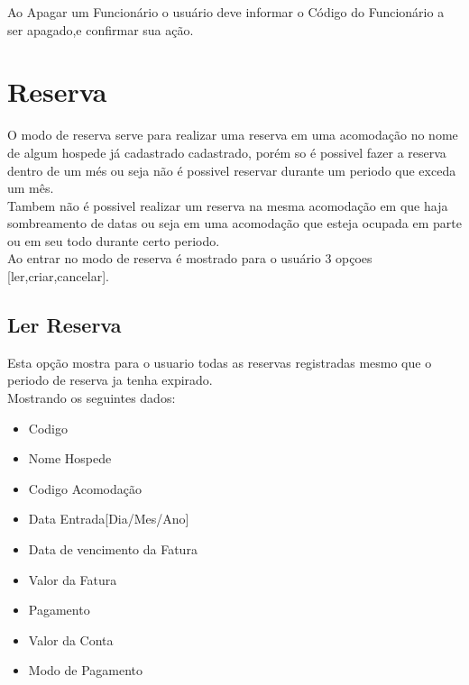 \documentclass[titlepage]{article}
\begin{document}
				Ao Apagar um Funcionário o usuário deve informar o Código do Funcionário a ser apagado,e confirmar sua ação. \\

				\newpage
				\section{Reserva}
				O modo de reserva serve para realizar uma reserva em uma acomodação no nome de algum hospede já cadastrado cadastrado, porém so é possivel fazer a reserva dentro de um més ou seja não é possivel reservar durante um periodo que exceda um mês.\\
				Tambem não é possivel realizar um reserva na mesma acomodação em que haja sombreamento de datas ou seja em uma acomodação que esteja ocupada em parte ou em seu todo durante certo periodo.\\
				Ao entrar no modo de reserva é mostrado para o usuário 3 opçoes [ler,criar,cancelar].\\

				\subsection{Ler Reserva}
				Esta opção mostra para o usuario todas as reservas registradas mesmo que o periodo de reserva ja tenha expirado.\\
				Mostrando os seguintes dados:

				\begin{itemize}
					\item Codigo
					\item Nome Hospede
					\item Codigo Acomodação
					\item Data Entrada[Dia/Mes/Ano]
					\item Data de vencimento da Fatura
					\item Valor da Fatura
					\item Pagamento
					\item Valor da Conta
					\item Modo de Pagamento
				\end{itemize}

				\newpage
\end{document}
